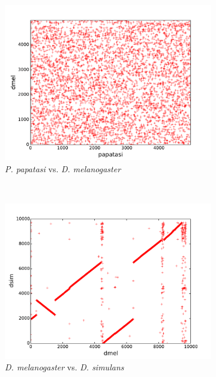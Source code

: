\begin{figure}[H]
\begin{subfigure}[b]{0.45\textwidth}
    \includegraphics[width=\textwidth]{figures/synteny/papatasi_dmel_plot}
    \caption{\emph{P. papatasi} vs. \emph{D. melanogaster}}
    \label{fig:synteny-dotplots-papatasi-dmel}
  \end{subfigure}
  ~
  \begin{subfigure}[b]{0.45\textwidth}
    \includegraphics[width=\textwidth]{figures/synteny/dmel_dsim_plot}
    \caption{\emph{D. melanogaster} vs. \emph{D. simulans}}
    \label{fig:synteny-dotplots-drosophila}
  \end{subfigure}
  ~
  \begin{subfigure}[b]{0.45\textwidth}

\end{subfigure}
\end{figure}
